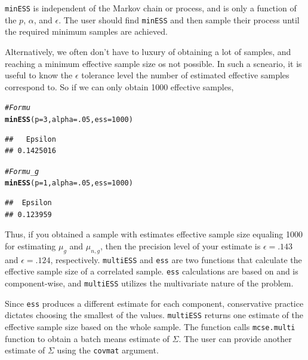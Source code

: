 \documentclass[11pt]{article}\usepackage[]{graphicx}\usepackage[]{color}
\makeatletter
\newcommand{\hlnum}[1]{\textcolor[rgb]{0.686,0.059,0.569}{#1}}%
\newcommand{\hlcom}[1]{\textcolor[rgb]{0.678,0.584,0.686}{\textit{#1}}}%
\newcommand{\hlstd}[1]{\textcolor[rgb]{0.345,0.345,0.345}{#1}}%
\newcommand{\hlkwc}[1]{\textcolor[rgb]{0.333,0.667,0.333}{#1}}%
\newcommand{\hlkwd}[1]{\textcolor[rgb]{0.737,0.353,0.396}{\textbf{#1}}}%
\newenvironment{kframe}{%
 \def\at@end@of@kframe{}%
 \ifinner\ifhmode%
  \def\at@end@of@kframe{\end{minipage}}%
  \begin{minipage}{\columnwidth}%
 \fi\fi%
 \def\FrameCommand##1{\hskip\@totalleftmargin \hskip-\fboxsep
 \colorbox{shadecolor}{##1}\hskip-\fboxsep
     \hskip-\linewidth \hskip-\@totalleftmargin \hskip\columnwidth}%
 \MakeFramed {\advance\hsize-\width
   \@totalleftmargin\z@ \linewidth\hsize
   \@setminipage}}%
 {\par\unskip\endMakeFramed%
 \at@end@of@kframe}
\newenvironment{knitrout}{}{} %
\makeatother
\begin{document}
\texttt{minESS} is independent of the Markov chain or process, and is only a function of the  $p$, $\alpha$, and $\epsilon$. The user should find \texttt{minESS} and then sample their process until the required minimum samples are achieved. 

Alternatively, we often don't have to luxury of obtaining a lot of samples, and reaching a minimum effective sample size os not possible. In such a scneario, it is useful to know the $\epsilon$ tolerance level the number of estimated effective samples correspond to. So if we can only obtain 1000 effective samples,
\begin{knitrout}
\color{fgcolor}\begin{kframe}
\begin{alltt}
\hlcom{# For mu}
\hlkwd{minESS}\hlstd{(}\hlkwc{p} \hlstd{=} \hlnum{3}\hlstd{,} \hlkwc{alpha} \hlstd{=} \hlnum{.05}\hlstd{,} \hlkwc{ess} \hlstd{=} \hlnum{1000}\hlstd{)}
\end{alltt}
\begin{verbatim}
##   Epsilon 
## 0.1425016
\end{verbatim}
\begin{alltt}
\hlcom{#For mu_g}
\hlkwd{minESS}\hlstd{(}\hlkwc{p} \hlstd{=} \hlnum{1}\hlstd{,} \hlkwc{alpha} \hlstd{=} \hlnum{.05}\hlstd{,} \hlkwc{ess} \hlstd{=} \hlnum{1000}\hlstd{)}
\end{alltt}
\begin{verbatim}
##  Epsilon 
## 0.123959
\end{verbatim}
\end{kframe}
\end{knitrout}

Thus, if you obtained a sample with estimates effective sample size equaling 1000 for estimating $\mu_g$ and $\mu_{n,g}$, then the precision level of your estimate is $\epsilon = .143$ and $\epsilon = .124$, respectively.
\texttt{multiESS} and \texttt{ess} are two functions that calculate the effective sample size of a correlated sample. \texttt{ess} calculations are based on \cite{gong2015practical} and is component-wise, and \texttt{multiESS} utilizes the multivariate nature of the problem.


Since \texttt{ess} produces a different estimate for each component, conservative practice dictates choosing the smallest of the values. \texttt{multiESS} returns one estimate of the effective sample size based on the whole sample. The function calls \texttt{mcse.multi} function to obtain a batch means estimate of $\Sigma$. The user can provide another estimate of $\Sigma$ using the \texttt{covmat} argument.
\end{document}
